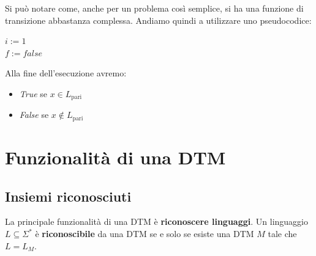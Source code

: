 Si può notare come, anche per un problema così semplice, si ha una funzione di transizione abbastanza complessa. Andiamo quindi a utilizzare uno pseudocodice:
\begin{center}
	\begin{minipage}{.7\textwidth}
		\begin{tcolorbox}[
			colback=white,
			sharp corners,
			boxrule=.3mm,
			left=20pt,
			top=0pt,
			bottom=0pt,
			title=Parità$(n)$,
			colbacktitle=white,
			coltitle=black
			]
			\LinesNumbered
			\begin{algorithm}[H]
				\SetAlgoNoEnd
				$i:=1$ \\
				$f:=false$ \\
			\end{algorithm}
		\end{tcolorbox}
	\end{minipage}
\end{center}

Alla fine dell'esecuzione avremo: 
\begin{itemize}
	\item \textit{True} se $x \in L_{\text{pari}}$
	\item \textit{False} se $x \notin L_{\text{pari}}$
\end{itemize}

\section{Funzionalità di una DTM}

\subsection{Insiemi riconosciuti}

La principale funzionalità di una DTM è \textbf{riconoscere linguaggi}. Un linguaggio $L \subseteq \Sigma^\ast$ è \textbf{riconoscibile} da una DTM se e solo se esiste una DTM $M$ tale che $L = L_M$.

